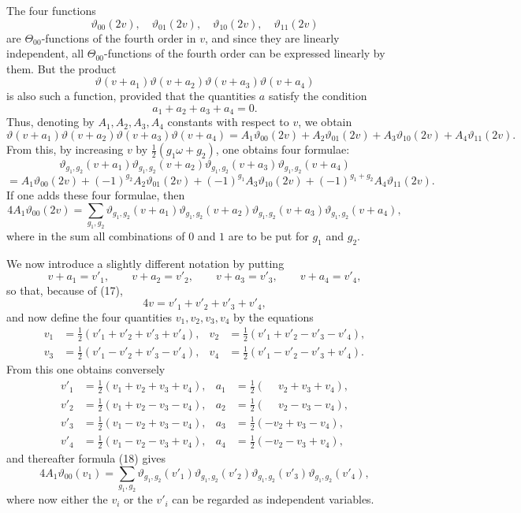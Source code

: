 \documentclass[11pt]{article}
\newcommand{\tht}{\vartheta}
\begin{document}
The four functions
\begin{equation}
\tht_{00}(2v),\quad \tht_{01}(2v),\quad \tht_{10}(2v),\quad \tht_{11}(2v)
\tag{15}
\end{equation}
are $\Theta_{00}$-functions of the fourth order in $v$, and since they are linearly independent, all $\Theta_{00}$-functions of the fourth order can be expressed linearly by them. But the product
\begin{equation}
\tht(v+a_1)\tht(v+a_2)\tht(v+a_3)\tht(v+a_4)
\tag{16}
\end{equation}
is also such a function, provided that the quantities $a$ satisfy the condition
\begin{equation}
a_1+a_2+a_3+a_4=0.
\tag{17}
\end{equation}
Thus, denoting by $A_1,A_2,A_3,A_4$ constants with respect to $v$, we obtain
\[
\tht(v+a_1)\tht(v+a_2)\tht(v+a_3)\tht(v+a_4)
=A_1\tht_{00}(2v)+A_2\tht_{01}(2v)+A_3\tht_{10}(2v)+A_4\tht_{11}(2v).
\]
From this, by increasing $v$ by $\frac12(g_1\omega+g_2)$, one obtains four formulae:
\[
\tht_{g_1,g_2}(v+a_1)\tht_{g_1,g_2}(v+a_2)\tht_{g_1,g_2}(v+a_3)\tht_{g_1,g_2}(v+a_4)
\]
\[
=A_1\tht_{00}(2v)+(-1)^{g_2}A_2\tht_{01}(2v)+(-1)^{g_1}A_3\tht_{10}(2v)+(-1)^{g_1+g_2}A_4\tht_{11}(2v).
\]
If one adds these four formulae, then
\begin{equation}
4A_1\tht_{00}(2v)
=\sum_{g_1,g_2}\tht_{g_1,g_2}(v+a_1)\tht_{g_1,g_2}(v+a_2)
\tht_{g_1,g_2}(v+a_3)\tht_{g_1,g_2}(v+a_4),
\tag{18}
\end{equation}
where in the sum all combinations of $0$ and $1$ are to be put for $g_1$ and $g_2$.

We now introduce a slightly different notation by putting
\[
v+a_1=v'_1,\qquad v+a_2=v'_2,\qquad v+a_3=v'_3,\qquad v+a_4=v'_4,
\]
so that, because of (17),
\[
4v=v'_1+v'_2+v'_3+v'_4,
\]
and now define the four quantities $v_1,v_2,v_3,v_4$ by the equations
\begin{equation}
\begin{aligned}
v_1&=\frac12(v'_1+v'_2+v'_3+v'_4),&
 v_2&=\frac12(v'_1+v'_2-v'_3-v'_4),\\
v_3&=\frac12(v'_1-v'_2+v'_3-v'_4),&
 v_4&=\frac12(v'_1-v'_2-v'_3+v'_4).
\end{aligned}
\tag{19}
\end{equation}
From this one obtains conversely
\begin{equation}
\begin{aligned}
v'_1&=\tfrac12(v_1+v_2+v_3+v_4),& a_1&=\tfrac12(\phantom{-}v_2+v_3+v_4),\\
v'_2&=\tfrac12(v_1+v_2-v_3-v_4),& a_2&=\tfrac12(\phantom{-}v_2-v_3-v_4),\\
v'_3&=\tfrac12(v_1-v_2+v_3-v_4),& a_3&=\tfrac12(-v_2+v_3-v_4),\\
v'_4&=\tfrac12(v_1-v_2-v_3+v_4),& a_4&=\tfrac12(-v_2-v_3+v_4),
\end{aligned}
\tag{20}
\end{equation}
and thereafter formula (18) gives
\[
4A_1\tht_{00}(v_1)=\sum_{g_1,g_2}\tht_{g_1,g_2}(v'_1)\tht_{g_1,g_2}(v'_2)\tht_{g_1,g_2}(v'_3)\tht_{g_1,g_2}(v'_4),
\]
where now either the $v_i$ or the $v'_i$ can be regarded as independent variables.
\end{document}
